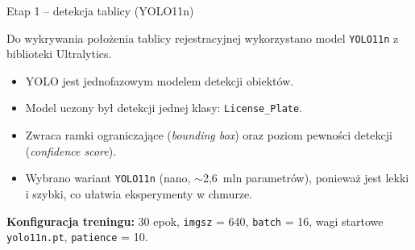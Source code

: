\documentclass{beamer}
\begin{document}
\begin{frame}{Etap 1 -- detekcja tablicy (YOLO11n)}

Do wykrywania położenia tablicy rejestracyjnej wykorzystano model \texttt{YOLO11n} z biblioteki Ultralytics.

\begin{itemize}
    \item YOLO jest jednofazowym modelem detekcji obiektów.
    \item Model uczony był detekcji jednej klasy: \texttt{License\_Plate}.
    \item Zwraca ramki ograniczające (\textit{bounding box}) oraz poziom pewności
    detekcji (\textit{confidence score}).
    \item Wybrano wariant \texttt{YOLO11n} (nano, $\sim$2{,}6~mln parametrów),
    ponieważ jest lekki i szybki, co ułatwia eksperymenty w chmurze.
\end{itemize}

\vspace{0.2cm}

\footnotesize
\textbf{Konfiguracja treningu:} 30 epok, \texttt{imgsz} = 640, \texttt{batch} = 16,
wagi startowe \texttt{yolo11n.pt}, \texttt{patience} = 10.

\end{frame}

\end{document}
